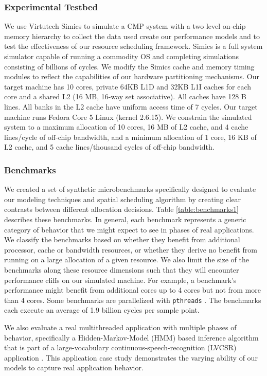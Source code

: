 \subsubsection*{Experimental Testbed}
We use Virtutech Simics \cite{simics} to simulate a CMP system with a two level on-chip memory hierarchy to collect the data used create our performance models and to test the effectiveness of our resource scheduling framework.  Simics is a full system simulator capable of running a commodity OS and completing simulations consisting of billions of cycles. We modify the Simics cache and memory timing modules to reflect the capabilities of our hardware partitioning mechanisms.  Our target machine has 10 cores, private 64KB L1D and 32KB L1I caches for each core and a shared L2 (16 MB, 16-way set associative).  All caches have 128 B lines.   All banks in the L2 cache have uniform access time of 7 cycles.  Our target machine runs Fedora Core 5 Linux (kernel 2.6.15). We constrain the simulated system to a maximum allocation of 10 cores, 16 MB of L2 cache, and 4 cache lines/cycle of off-chip bandwidth, and a minimum allocation of 1 core, 16 KB of L2 cache, and 5 cache lines/thousand cycles of off-chip bandwidth.

\subsubsection*{Benchmarks}
We created a set of synthetic microbenchmarks specifically designed to evaluate our modeling techniques and spatial scheduling algorithm by creating clear contrasts between different allocation decisions.  Table \ref{table:benchmarks1} describes these benchmarks.  In general, each benchmark represents a generic category of behavior that we might expect to see in phases of real applications.  We classify the benchmarks based on whether they benefit from additional processor, cache or bandwidth resources, or whether they derive no benefit from running on a large allocation of a given resource.  We also limit the size of the benchmarks along these resource dimensions such that they will encounter performance cliffs on our simulated machine.  For example, a benchmark's performance might benefit from additional cores up to 4 cores but not from more than 4 cores.   Some benchmarks are parallelized with {\tt pthreads} \cite{pthreads}.  The benchmarks each execute an average of 1.9 billion cycles per sample point.

We also evaluate a real multithreaded application with multiple phases of behavior, specifically
a Hidden-Markov-Model (HMM) based inference algorithm that is part of a large-vocabulary continuous-speech-recognition (LVCSR) application \cite{chong-eama08, huang-speech}. This application case study demonstrates the varying ability of our models to capture real application behavior.

